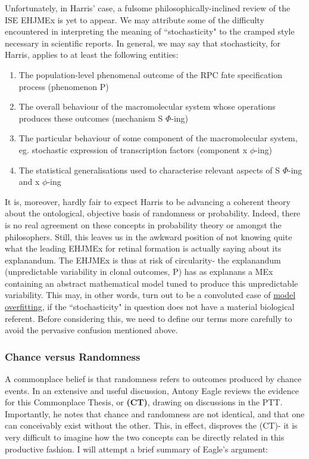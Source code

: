 Unfortunately, in Harris' case, a fulsome philosophically-inclined review of the ISE EHJMEx is yet to appear. We may attribute some of the difficulty encountered in interpreting the meaning of ``stochasticity" to the cramped style necessary in scientific reports. In general, we may say that stochasticity, for Harris, applies to at least the following entities:

\begin{enumerate}
\item The population-level phenomenal outcome of the RPC fate specification process (phenomenon P)
\item The overall behaviour of the macromolecular system whose operations produces these outcomes (mechanism S $\Phi$-ing)
\item The particular behaviour of some component of the macromolecular system, eg. stochastic expression of transcription factors (component x $\phi$-ing)
\item The statistical generalisations used to characterise relevant aspects of S $\Phi$-ing and x $\phi$-ing
\end{enumerate}

It is, moreover, hardly fair to expect Harris to be advancing a coherent theory about the ontological, objective basis of randomness or probability. Indeed, there is no real agreement on these concepts in probability theory or amongst the philosophers. Still, this leaves us in the awkward position of not knowing quite what the leading EHJMEx for retinal formation is actually saying about its explanandum. The EHJMEx is thus at risk of circularity- the explanandum (unpredictable variability in clonal outcomes, P) has as explanans a MEx containing an abstract mathematical model tuned to produce this unpredictable variability. This may, in other words, turn out to be a convoluted case of \hyperref[fitting]{model overfitting}, if the ``stochasticity" in question does not have a material biological referent. Before considering this, we need to define our terms more carefully to avoid the pervasive confusion mentioned above.

\subsubsection{Chance versus Randomness}
A commonplace belief is that randomness refers to outcomes produced by chance events. In an extensive and useful discussion, Antony Eagle reviews the evidence for this Commonplace Thesis, or \textbf{(CT)}\cite{Eagle2018}, drawing on discussions in the PTT. Importantly, he notes that chance and randomness are not identical, and that one can conceivably exist without the other. This, in effect, disproves the (CT)- it is very difficult to imagine how the two concepts can be directly related in this productive fashion. I will attempt a brief summary of Eagle's argument:

